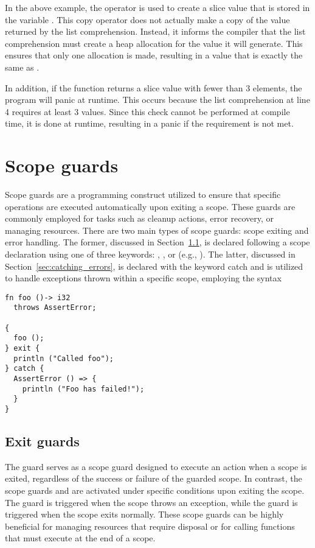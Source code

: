 In the above example, the  operator is used to create a slice value
that is stored in the variable . This copy operator does not actually
make a copy of the value returned by the list comprehension. Instead, it informs
the compiler that the list comprehension must create a heap allocation for the
value it will generate. This ensures that only one allocation is made, resulting
in a value that is exactly the same as .

In addition, if the function  returns a slice value with fewer than 3
elements, the program will panic at runtime. This occurs because the list
comprehension at line 4 requires at least 3 values. Since this check cannot be
performed at compile time, it is done at runtime, resulting in a panic if the
requirement is not met.

\section{Scope guards}%
\label{sec:scope_guards}

Scope guards are a programming construct utilized to ensure that specific
operations are executed automatically upon exiting a scope. These guards are
commonly employed for tasks such as cleanup actions, error recovery, or managing
resources. There are two main types of scope guards: scope exiting and error
handling. The former, discussed in Section~\ref{sec:exit_guards}, is declared
following a scope declaration using one of three keywords: ,
, or  (e.g., ). The
latter, discussed in Section~\ref{sec:catching_errors}, is declared with the
keyword catch and is utilized to handle exceptions thrown within a specific
scope, employing the syntax 


\begin{lstlisting}[style=coloredverbatim]
fn foo ()-> i32
  throws AssertError;

{
  foo ();
} exit {
  println ("Called foo");
} catch {
  AssertError () => {
    println ("Foo has failed!");
  }
}
\end{lstlisting}

\subsection{Exit guards}
\label{sec:exit_guards}

The  guard serves as a scope guard designed to execute an action
when a scope is exited, regardless of the success or failure of the guarded
scope. In contrast, the scope guards  and  are
activated under specific conditions upon exiting the scope. The guard
 is triggered when the scope throws an exception, while the guard
 is triggered when the scope exits normally. These scope guards
can be highly beneficial for managing resources that require disposal or for
calling functions that must execute at the end of a scope.

